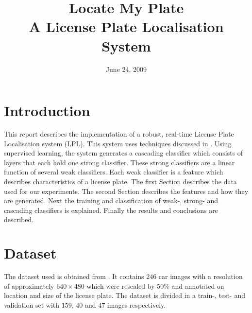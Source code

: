 \documentclass[a4paper,11pt]{article}
\title{Locate My Plate \\ A License Plate Localisation System}
\date{June 24, 2009}
\begin{document}
\maketitle
\section{Introduction}
This report describes the implementation of a robust, real-time License Plate
Localisation system (LPL). This system uses techniques discussed in
\cite{dlagnekov_thesis, zhang}. Using supervised learning, the system generates
a cascading classifier which consists of layers that each hold one strong
classifier. These strong classifiers are a linear function of several weak
classifiers. Each weak classifier is a feature which describes characteristics
of a license plate. The first Section describes the data used for our
experiments. The second Section describes the features and how they are
generated.  Next the training and classification of weak-, strong- and
cascading classifiers is explained. Finally the results and conclusions are
described.

\section{Dataset}
The dataset used is obtained from \cite{dlagnekov_dataset}. It contains $246$ car
images with a resolution of approximately $640\times480$ which were rescaled by
$50\%$ and annotated on location and size of the license plate. The dataset is
divided in a train-, test- and validation set with $159$, $40$ and $47$ images
respectively.
\end{document}
